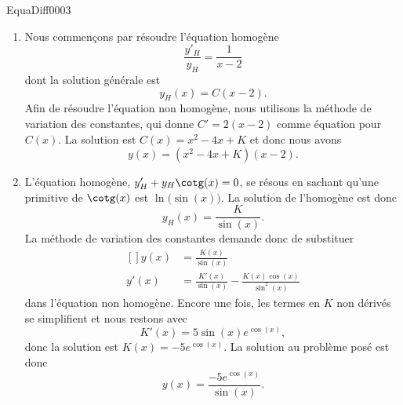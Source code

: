 \begin{corrige}{EquaDiff0003}

\begin{enumerate}


\item
Nous commençons par résoudre l'équation homogène
\begin{equation}
	\frac{ y'_H }{ y_H }=\frac{1}{ x-2 }
\end{equation}
dont la solution générale est
\begin{equation}
	y_H(x)=C(x-2).
\end{equation}
Afin de résoudre l'équation non homogène, nous utilisons la méthode de variation des constantes, qui donne $C'=2(x-2)$ comme équation pour $C(x)$. La solution est $C(x)=x^2-4x+K$ et donc nous avons
\begin{equation}
	y(x)=(x^2-4x+K)(x-2).
\end{equation}

\item
L'équation homogène, $y'_H+y_H\cotg(x)=0$, se résous en sachant qu'une primitive de $\cotg(x)$ est $\ln\big(\sin(x)\big)$. La solution de l'homogène est donc
\begin{equation}
	y_H(x)=\frac{ K }{ \sin(x) }.
\end{equation}
La méthode de variation des constantes demande donc de substituer
\begin{equation}
	\begin{aligned}[]
		y(x)&=\frac{ K(x) }{ \sin(x) }\\
		y'(x)&=\frac{ K'(x) }{ \sin(x) }-\frac{ K(x)\cos(x) }{ \sin^2(x) }
	\end{aligned}
\end{equation}
dans l'équation non homogène. Encore une fois, les termes en $K$ non dérivés se simplifient et nous restons avec
\begin{equation}
	K'(x)=5\sin(x) e^{\cos(x)},
\end{equation}
donc la solution est $K(x)=-5 e^{\cos(x)}$. La solution au problème posé est donc
\begin{equation}
	y(x)=\frac{ -5 e^{\cos(x)} }{ \sin(x) }.
\end{equation}


\end{enumerate}


\end{corrige}
